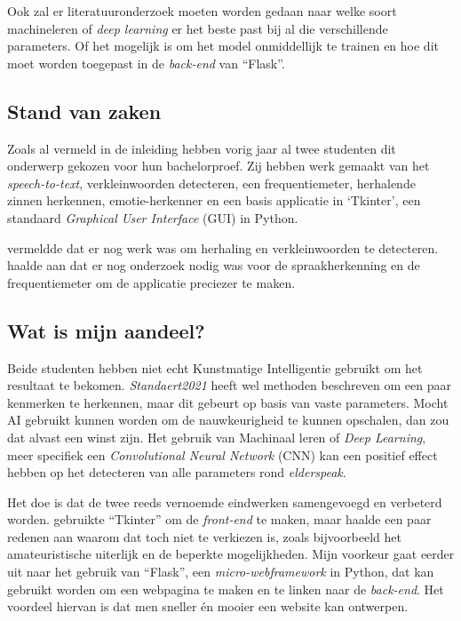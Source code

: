 Ook zal er literatuuronderzoek moeten worden gedaan naar welke soort machineleren of \textit{deep learning} er het beste past bij al die verschillende parameters.
Of het mogelijk is om het model onmiddellijk te trainen en hoe dit moet worden toegepast in de \textit{back-end} van ``Flask''.

\subsection{Stand van zaken}\label{subsec:stand-van-zaken}

Zoals al vermeld in de inleiding hebben vorig jaar al twee studenten dit onderwerp gekozen voor hun bachelorproef.
Zij hebben werk gemaakt van het \textit{speech-to-text}, verkleinwoorden detecteren, een frequentiemeter, herhalende zinnen herkennen, emotie-herkenner en een basis applicatie in `Tkinter', een standaard \textit{Graphical User Interface} (GUI) in Python.

\textcite{Beeckman2021} vermeldde dat er nog werk was om herhaling en verkleinwoorden te detecteren. \textcite{Standaert2021} haalde aan dat er nog onderzoek nodig was voor de spraakherkenning en de frequentiemeter om de applicatie preciezer te maken.

\subsection{Wat is mijn aandeel?}\label{subsec:watismijnadeel}

Beide studenten hebben niet echt Kunstmatige Intelligentie gebruikt om het resultaat te bekomen. \textit{Standaert2021} heeft wel methoden beschreven om een paar kenmerken te herkennen, maar dit gebeurt op basis van vaste parameters.
Mocht AI gebruikt kunnen worden om de nauwkeurigheid te kunnen opschalen, dan zou dat alvast een winst zijn.
Het gebruik van Machinaal leren of \textit{Deep Learning}, meer specifiek een \textit{Convolutional Neural Network} (CNN) kan een positief effect hebben op het detecteren van alle parameters rond \textit{elderspeak}.

Het doe is dat de twee reeds vernoemde eindwerken samengevoegd en verbeterd worden. \textcite{Beeckman2021} gebruikte ``Tkinter'' om de \textit{front-end} te maken, maar haalde een paar redenen aan waarom dat toch niet te verkiezen is, zoals bijvoorbeeld het amateuristische uiterlijk en de beperkte mogelijkheden.
Mijn voorkeur gaat eerder uit naar het gebruik van ``Flask'', een \textit{micro-webframework} in Python, dat kan gebruikt worden om een webpagina te maken en te linken naar de \textit{back-end}.
Het voordeel hiervan is dat men sneller én mooier een website kan ontwerpen.



